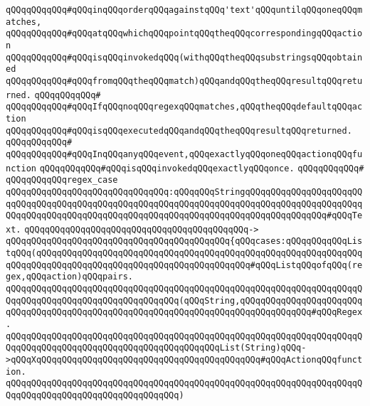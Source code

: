 \verb|qQQqqQQqqQQq#qQQqinqQQqorderqQQqagainstqQQq'text'qQQquntilqQQqoneqQQqmatches,|\newline
\verb|qQQqqQQqqQQq#qQQqatqQQqwhichqQQqpointqQQqtheqQQqcorrespondingqQQqaction|\newline
\verb|qQQqqQQqqQQq#qQQqisqQQqinvokedqQQq(withqQQqtheqQQqsubstringsqQQqobtained|\newline
\verb|qQQqqQQqqQQq#qQQqfromqQQqtheqQQqmatch)qQQqandqQQqtheqQQqresultqQQqreturned.|\newline
\verb|qQQqqQQqqQQq#|\newline
\verb|qQQqqQQqqQQq#qQQqIfqQQqnoqQQqregexqQQqmatches,qQQqtheqQQqdefaultqQQqaction|\newline
\verb|qQQqqQQqqQQq#qQQqisqQQqexecutedqQQqandqQQqtheqQQqresultqQQqreturned.|\newline
\verb|qQQqqQQqqQQq#|\newline
\verb|qQQqqQQqqQQq#qQQqInqQQqanyqQQqevent,qQQqexactlyqQQqoneqQQqactionqQQqfunction|\newline
\verb|qQQqqQQqqQQq#qQQqisqQQqinvokedqQQqexactlyqQQqonce.|\newline
\verb|qQQqqQQqqQQq#|\newline
\verb|qQQqqQQqqQQqregex_case|\newline
\verb|qQQqqQQqqQQqqQQqqQQqqQQqqQQqqQQq:qQQqqQQqStringqQQqqQQqqQQqqQQqqQQqqQQqqQQqqQQqqQQqqQQqqQQqqQQqqQQqqQQqqQQqqQQqqQQqqQQqqQQqqQQqqQQqqQQqqQQqqQQqqQQqqQQqqQQqqQQqqQQqqQQqqQQqqQQqqQQqqQQqqQQqqQQqqQQqqQQqqQQq#qQQqText.|\newline
\verb|qQQqqQQqqQQqqQQqqQQqqQQqqQQqqQQqqQQqqQQqqQQq->|\newline
\verb|qQQqqQQqqQQqqQQqqQQqqQQqqQQqqQQqqQQqqQQqqQQq{qQQqcases:qQQqqQQqqQQqListqQQq(qQQqqQQqqQQqqQQqqQQqqQQqqQQqqQQqqQQqqQQqqQQqqQQqqQQqqQQqqQQqqQQqqQQqqQQqqQQqqQQqqQQqqQQqqQQqqQQqqQQqqQQqqQQqqQQq#qQQqListqQQqofqQQq(regex,qQQqaction)qQQqpairs.|\newline
\verb|qQQqqQQqqQQqqQQqqQQqqQQqqQQqqQQqqQQqqQQqqQQqqQQqqQQqqQQqqQQqqQQqqQQqqQQqqQQqqQQqqQQqqQQqqQQqqQQqqQQqqQQq(qQQqString,qQQqqQQqqQQqqQQqqQQqqQQqqQQqqQQqqQQqqQQqqQQqqQQqqQQqqQQqqQQqqQQqqQQqqQQqqQQqqQQqqQQq#qQQqRegex.|\newline
\verb|qQQqqQQqqQQqqQQqqQQqqQQqqQQqqQQqqQQqqQQqqQQqqQQqqQQqqQQqqQQqqQQqqQQqqQQqqQQqqQQqqQQqqQQqqQQqqQQqqQQqqQQqqQQqqQQqList(String)qQQq->qQQqXqQQqqQQqqQQqqQQqqQQqqQQqqQQqqQQqqQQqqQQqqQQq#qQQqActionqQQqfunction.|\newline
\verb|qQQqqQQqqQQqqQQqqQQqqQQqqQQqqQQqqQQqqQQqqQQqqQQqqQQqqQQqqQQqqQQqqQQqqQQqqQQqqQQqqQQqqQQqqQQqqQQqqQQqqQQq)|\newline

